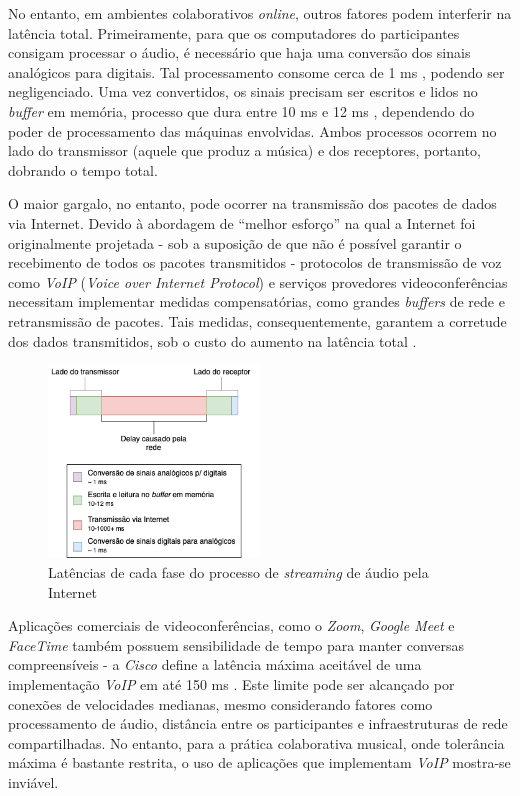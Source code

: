 No entanto, em ambientes colaborativos \textit{online}, outros fatores podem interferir na latência total. Primeiramente, para que os computadores do participantes consigam processar o áudio, é necessário que haja uma conversão dos sinais analógicos para digitais. Tal processamento consome cerca de 1 ms \cite{how_low_can_you_go}, podendo ser negligenciado. Uma vez convertidos, os sinais precisam ser escritos e lidos no \textit{buffer} em memória, processo que dura entre 10 ms e 12 ms \cite{how_low_can_you_go}, dependendo do poder de processamento das máquinas envolvidas. Ambos processos ocorrem no lado do transmissor (aquele que produz a música) e dos receptores, portanto, dobrando o tempo total.

O maior gargalo, no entanto, pode ocorrer na transmissão dos pacotes de dados via Internet. Devido à abordagem de ``melhor esforço'' na qual a Internet foi originalmente projetada - sob a suposição de que não é possível garantir o recebimento de todos os pacotes transmitidos - protocolos de transmissão de voz como \textit{VoIP} (\textit{Voice over Internet Protocol}) e serviços provedores videoconferências necessitam implementar medidas compensatórias, como grandes \textit{buffers} de rede e retransmissão de pacotes. Tais medidas, consequentemente, garantem a corretude dos dados transmitidos, sob o custo do aumento na latência total \cite{carot_low_latency}.

\begin{figure}[htbp]
\centering
\includegraphics[width=0.5\textwidth]{images/streaming-latency.png}
\caption{Latências de cada fase do processo de \textit{streaming} de áudio pela Internet}
\label{fig:streaming_latencies}
\end{figure}

Aplicações comerciais de videoconferências, como o \textit{Zoom}, \textit{Google Meet} e \textit{FaceTime} também  possuem sensibilidade de tempo para manter conversas compreensíveis - a \textit{Cisco} define a latência máxima aceitável de uma implementação \textit{VoIP} em até 150 ms \cite{cisco}. Este limite pode ser alcançado por conexões de velocidades medianas, mesmo considerando fatores como processamento de áudio, distância entre os participantes e infraestruturas de rede compartilhadas. No entanto, para a prática colaborativa musical, onde tolerância máxima é bastante restrita, o uso de aplicações que implementam \textit{VoIP} mostra-se inviável.

